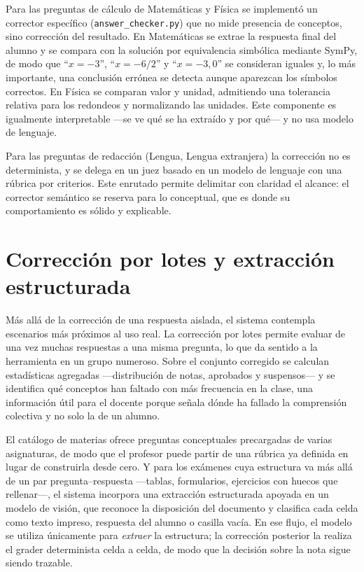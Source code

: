 Para las preguntas de cálculo de Matemáticas y Física se implementó un corrector específico (\texttt{answer\_checker.py}) que no mide presencia de conceptos, sino corrección del resultado. En Matemáticas se extrae la respuesta final del alumno y se compara con la solución por equivalencia simbólica mediante SymPy, de modo que ``$x=-3$'', ``$x=-6/2$'' y ``$x=-3{,}0$'' se consideran iguales y, lo más importante, una conclusión errónea se detecta aunque aparezcan los símbolos correctos. En Física se comparan valor y unidad, admitiendo una tolerancia relativa para los redondeos y normalizando las unidades. Este componente es igualmente interpretable —se ve qué se ha extraído y por qué— y no usa modelo de lenguaje.

Para las preguntas de redacción (Lengua, Lengua extranjera) la corrección no es determinista, y se delega en un juez basado en un modelo de lenguaje con una rúbrica por criterios. Este enrutado permite delimitar con claridad el alcance: el corrector semántico se reserva para lo conceptual, que es donde su comportamiento es sólido y explicable.

\section{Corrección por lotes y extracción estructurada}

Más allá de la corrección de una respuesta aislada, el sistema contempla escenarios más próximos al uso real. La corrección por lotes permite evaluar de una vez muchas respuestas a una misma pregunta, lo que da sentido a la herramienta en un grupo numeroso. Sobre el conjunto corregido se calculan estadísticas agregadas —distribución de notas, aprobados y suspensos— y se identifica qué conceptos han faltado con más frecuencia en la clase, una información útil para el docente porque señala dónde ha fallado la comprensión colectiva y no solo la de un alumno.

El catálogo de materias ofrece preguntas conceptuales precargadas de varias asignaturas, de modo que el profesor puede partir de una rúbrica ya definida en lugar de construirla desde cero. Y para los exámenes cuya estructura va más allá de un par pregunta--respuesta —tablas, formularios, ejercicios con huecos que rellenar—, el sistema incorpora una extracción estructurada apoyada en un modelo de visión, que reconoce la disposición del documento y clasifica cada celda como texto impreso, respuesta del alumno o casilla vacía. En ese flujo, el modelo se utiliza únicamente para \emph{extraer} la estructura; la corrección posterior la realiza el grader determinista celda a celda, de modo que la decisión sobre la nota sigue siendo trazable.

